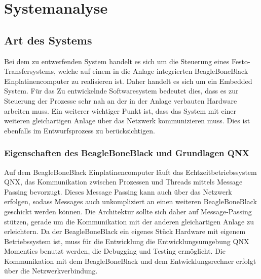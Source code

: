 














\section{Systemanalyse}\label{sec:systemanalyse}


\subsection{Art des Systems}

Bei dem zu entwerfenden System handelt es sich um die Steuerung eines Festo-Transfersystems, welche auf einem in die Anlage integrierten BeagleBoneBlack Einplatinencomputer zu realisieren ist.
Daher handelt es sich um ein Embedded System. 
Für das Zu entwickelnde Softwaresystem bedeutet dies, dass es zur Steuerung der Prozesse sehr nah an der in der Anlage verbauten Hardware arbeiten muss. 
Ein weiterer wichtiger Punkt ist, dass das System mit einer weiteren gleichartigen Anlage über das Netzwerk kommunizieren muss. Dies ist ebenfalls im Entwurfsprozess zu berücksichtigen.

\subsubsection{Eigenschaften des BeagleBoneBlack und Grundlagen QNX}

Auf dem BeagleBoneBlack Einplatinencomputer läuft das Echtzeitbetriebssystem QNX, das Kommunikation zwischen Prozessen und Threads mittels Message Passing bevorzugt.
Dieses Message Passing kann auch über das Netzwerk erfolgen, sodass Messages auch unkompliziert an einen weiteren BeagleBoneBlack geschickt werden können. 
Die Architektur sollte sich daher auf Message-Passing stützen, gerade um die Kommunikation mit der anderen gleichartigen Anlage zu erleichtern.
Da der BeagleBoneBlack ein eigenes Stück Hardware mit eigenem Betriebssystem ist, muss für die Entwicklung die Entwicklungsumgebung QNX Momentics benutzt werden, die Debugging und Testing ermöglicht.
Die Kommunikation mit dem BeagleBoneBlack und dem Entwicklungsrechner erfolgt über die Netzwerkverbindung.

